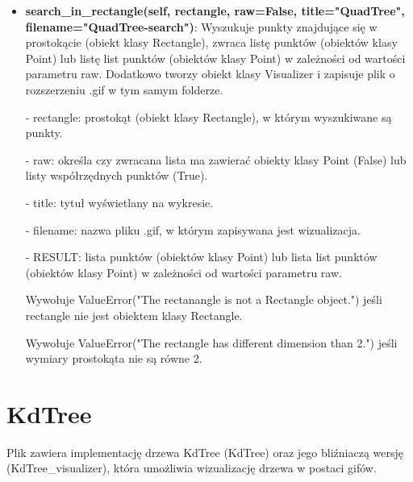 \documentclass{lab}
\begin{document}
\begin{itemize}
  \item \textbf{search\_in\_rectangle(self, rectangle, raw=False, title="QuadTree", filename="QuadTree-search")}:
  Wyszukuje punkty znajdujące się w prostokącie (obiekt klasy Rectangle), zwraca listę punktów (obiektów klasy Point) lub listę list punktów (obiektów klasy Point) w zależności od wartości parametru raw. Dodatkowo tworzy obiekt klasy Visualizer i zapisuje plik o rozszerzeniu .gif w tym samym folderze.

  - rectangle: prostokąt (obiekt klasy Rectangle), w którym wyszukiwane są punkty.

  - raw: określa czy zwracana lista ma zawierać obiekty klasy Point (False) lub listy współrzędnych punktów (True).

  - title: tytuł wyświetlany na wykresie.

  - filename: nazwa pliku .gif, w którym zapisywana jest wizualizacja.

  - RESULT: lista punktów (obiektów klasy Point) lub lista list punktów (obiektów klasy Point) w zależności od wartości parametru raw.

  Wywołuje ValueError("The rectanangle is not a Rectangle object.") jeśli rectangle nie jest obiektem klasy Rectangle.

  Wywołuje ValueError("The rectangle has different dimension than 2.") jeśli wymiary prostokąta nie są równe 2.
\end{itemize}

\section{KdTree}
Plik zawiera implementację drzewa KdTree (KdTree) oraz jego bliźniaczą wersję (KdTree\_visualizer), która umożliwia wizualizację drzewa w postaci gifów.
\end{document}
